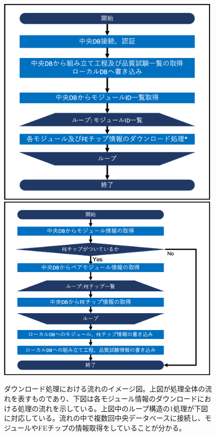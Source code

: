 \begin{figure}[bpt]\centering
  \begin{center}
  \includegraphics[width=11cm]{download_tool_flow_whole.png}
  \includegraphics[width=11cm]{download_tool_flow_detail.png}
  \caption[ダウンロード処理における流れのイメージ図]{ダウンロード処理における流れのイメージ図。上図が処理全体の流れを表すものであり、下図は各モジュール情報のダウンロードにおける処理の流れを示している。上図中のループ構造の1処理が下図に対応している。流れの中で複数回中央データベースに接続し、モジュールやFEチップの情報取得をしていることが分かる。}
  \label{download_algorithm}
  \end{center}
\end{figure}

